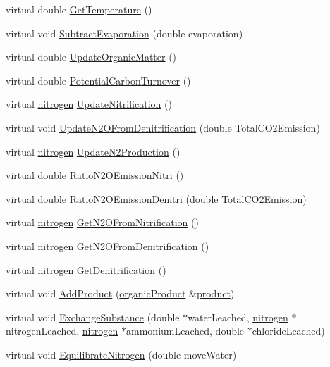 \begin{DoxyCompactItemize}
\item 
virtual double \hyperlink{classsoil_layer_a4767a2f084104f8c8407af7a6c7d7513}{GetTemperature} ()
\item 
virtual void \hyperlink{classsoil_layer_a9a38de935d6d6abe383bfd2f886559f3}{SubtractEvaporation} (double evaporation)
\item 
virtual double \hyperlink{classsoil_layer_a3499e118eccf838b5d9c7784cfbecee8}{UpdateOrganicMatter} ()
\item 
virtual double \hyperlink{classsoil_layer_ae664742ac96eb6f49caa66e8c4b8d708}{PotentialCarbonTurnover} ()
\item 
virtual \hyperlink{classnitrogen}{nitrogen} \hyperlink{classsoil_layer_a05e9eb7bc23f2ca60d2358eae2e3638c}{UpdateNitrification} ()
\item 
virtual void \hyperlink{classsoil_layer_ae923fdabe8dc5e40195e3cf39b9ef569}{UpdateN2OFromDenitrification} (double TotalCO2Emission)
\item 
virtual \hyperlink{classnitrogen}{nitrogen} \hyperlink{classsoil_layer_a994f47ea2ca0d8a0d98515bb83600cf2}{UpdateN2Production} ()
\item 
virtual double \hyperlink{classsoil_layer_a00af828149bbb4f4f7e1544bf75a33e3}{RatioN2OEmissionNitri} ()
\item 
virtual double \hyperlink{classsoil_layer_affc819f2895a9db557edc95966e56473}{RatioN2OEmissionDenitri} (double TotalCO2Emission)
\item 
virtual \hyperlink{classnitrogen}{nitrogen} \hyperlink{classsoil_layer_a455eb10fae87a69aeb706a55b0a934c8}{GetN2OFromNitrification} ()
\item 
virtual \hyperlink{classnitrogen}{nitrogen} \hyperlink{classsoil_layer_a75f44f1c6c3825b28dcdfe4653790618}{GetN2OFromDenitrification} ()
\item 
virtual \hyperlink{classnitrogen}{nitrogen} \hyperlink{classsoil_layer_a65c071c06b636ea34ba54ea59d00d2ae}{GetDenitrification} ()
\item 
virtual void \hyperlink{classsoil_layer_a02f3d74a63ae05911287bd29ce22427c}{AddProduct} (\hyperlink{classorganic_product}{organicProduct} \&\hyperlink{classproduct}{product})
\item 
virtual void \hyperlink{classsoil_layer_a2a88f50eac8285e6fc12447276c0daff}{ExchangeSubstance} (double $\ast$waterLeached, \hyperlink{classnitrogen}{nitrogen} $\ast$nitrogenLeached, \hyperlink{classnitrogen}{nitrogen} $\ast$ammoniumLeached, double $\ast$chlorideLeached)
\item 
virtual void \hyperlink{classsoil_layer_a0761c6670b5ffb8affd945117f84335b}{EquilibrateNitrogen} (double moveWater)

\end{DoxyCompactItemize}
